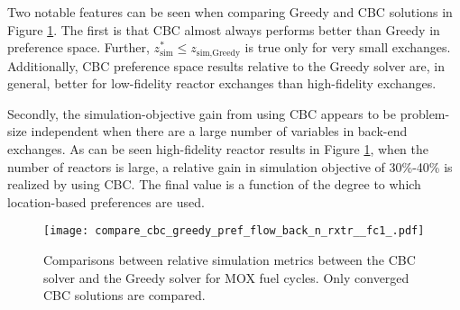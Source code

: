 Two notable features can be seen when comparing Greedy and CBC solutions in
Figure \ref{fig:compare_cbc_greedy_pref_flow_back_n_rxtr__fc1_}. The first is
that CBC almost always performs better than Greedy in preference space. Further,
$z^*_{\text{sim}} \leq z_{\text{sim}, \text{Greedy}}$ is true only for very
small exchanges. Additionally, CBC preference space results relative to the
Greedy solver are, in general, better for low-fidelity reactor exchanges than
high-fidelity exchanges.

Secondly, the simulation-objective gain from using CBC appears to be
problem-size independent when there are a large number of variables in back-end
exchanges. As can be seen high-fidelity reactor results in Figure
\ref{fig:compare_cbc_greedy_pref_flow_back_n_rxtr__fc1_}, when the number of
reactors is large, a relative gain in simulation objective of 30\%-40\% is
realized by using CBC. The final value is a function of the degree to which
location-based preferences are used.

\begin{figure}[h!]
  \begin{center}
    \texttt{[image: compare\_cbc\_greedy\_pref\_flow\_back\_n\_rxtr\_\_fc1\_.pdf]}
    \caption[]{
      \label{fig:compare_cbc_greedy_pref_flow_back_n_rxtr__fc1_}
      Comparisons between relative simulation metrics between the CBC solver and
      the Greedy solver for MOX fuel cycles. Only converged CBC
      solutions are compared.  }
  \end{center}
\end{figure}
